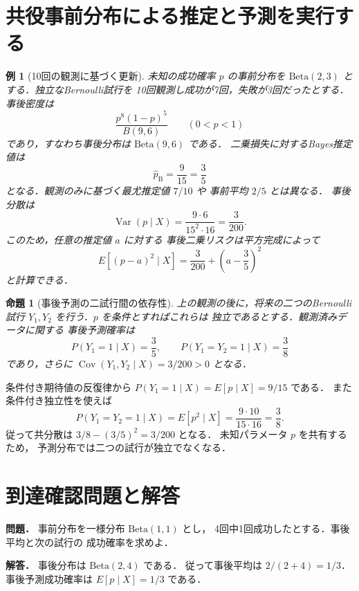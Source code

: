 \documentclass[a5paper,10pt,onecolumn]{jsarticle}
\makeatletter
\theoremstyle{mathnotetheorem}
\newtheorem{proposition}[theorem]{命題}
\newtheorem{example}[theorem]{例}
\renewcommand{\proofname}{証明}
\renewenvironment{proof}[1][\proofname]{%
  \par\pushQED{\qed}\normalfont\topsep4\p@\@plus2\p@\relax
  \trivlist\item[\hskip\labelsep\bfseries #1]\ignorespaces
}{\popQED\endtrivlist\@endpefalse}
\makeatother
\begin{document}
\section{共役事前分布による推定と予測を実行する}
\begin{example}[10回の観測に基づく更新]
未知の成功確率 $p$ の事前分布を
$\mathrm{Beta}(2,3)$ とする．独立なBernoulli試行を
10回観測し成功が7回，失敗が3回だったとする．
事後密度は
\[
 \frac{p^8(1-p)^5}{B(9,6)}\qquad(0<p<1)
\]
であり，すなわち事後分布は $\mathrm{Beta}(9,6)$ である．
二乗損失に対するBayes推定値は
\[
 \widehat p_{\mathrm B}=\frac9{15}=\frac35
\]
となる．観測のみに基づく最尤推定値 $7/10$ や
事前平均 $2/5$ とは異なる．
事後分散は
\[
 \operatorname{Var}(p\mid X)
 =\frac{9\cdot6}{15^2\cdot16}=\frac3{200}.
\]
このため，任意の推定値 $a$ に対する
事後二乗リスクは平方完成によって
\[
 E[(p-a)^2\mid X]=\frac3{200}
                    +\left(a-\frac35\right)^2
\]
と計算できる．
\end{example}
\begin{proposition}[事後予測の二試行間の依存性]
上の観測の後に，将来の二つのBernoulli試行
$Y_1,Y_2$ を行う．$p$ を条件とすればこれらは
独立であるとする．観測済みデータに関する
事後予測確率は
\[
 P(Y_1=1\mid X)=\frac35,\qquad
 P(Y_1=Y_2=1\mid X)=\frac38
\]
であり，さらに
$\operatorname{Cov}(Y_1,Y_2\mid X)=3/200>0$ となる．
\end{proposition}
\begin{proof}
条件付き期待値の反復律から
$P(Y_1=1\mid X)=E[p\mid X]=9/15$ である．
また条件付き独立性を使えば
\[
 P(Y_1=Y_2=1\mid X)
   =E[p^2\mid X]
   =\frac{9\cdot10}{15\cdot16}=\frac38.
\]
従って共分散は $3/8-(3/5)^2=3/200$ となる．
未知パラメータ $p$ を共有するため，
予測分布では二つの試行が独立でなくなる．
\end{proof}
\section*{到達確認問題と解答}
\noindent\textbf{問題．}
事前分布を一様分布 $\mathrm{Beta}(1,1)$ とし，
4回中1回成功したとする．事後平均と次の試行の
成功確率を求めよ．

\medskip\noindent\textbf{解答．}
事後分布は $\mathrm{Beta}(2,4)$ である．
従って事後平均は $2/(2+4)=1/3$．
事後予測成功確率は
$E[p\mid X]=1/3$ である．
\end{document}
